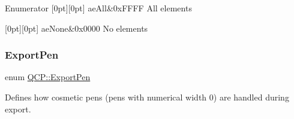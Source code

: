 \begin{DoxyEnumFields}{Enumerator}
[0pt][0pt]{}\mbox{\label{namespace_q_c_p_ae55dbe315d41fe80f29ba88100843a0caa897c232a0ffc8368e7c100ffc59ef31}} 
ae\+All&{\ttfamily 0x\+F\+F\+FF} All elements \\
\hline

[0pt][0pt]{}\mbox{\label{namespace_q_c_p_ae55dbe315d41fe80f29ba88100843a0caa9e90d81896358757d94275aeaa58f6a}} 
ae\+None&{\ttfamily 0x0000} No elements \\
\hline

\end{DoxyEnumFields}
\mbox{\label{namespace_q_c_p_a17844f19e1019693a953e1eb93536d2f}} 
\subsubsection{\texorpdfstring{Export\+Pen}{ExportPen}}
{\footnotesize\ttfamily enum \mbox{\hyperlink{namespace_q_c_p_a17844f19e1019693a953e1eb93536d2f}{Q\+C\+P\+::\+Export\+Pen}}}

Defines how cosmetic pens (pens with numerical width 0) are handled during export.

